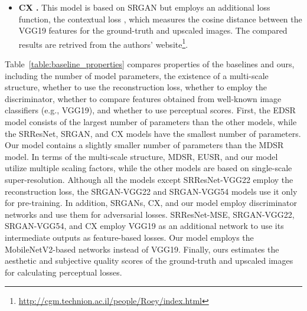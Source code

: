 \documentclass[runningheads]{llncs}
\begin{document}
\begin{itemize}
	\item \textbf{CX \cite{mechrez2018learning}.}
	This model is based on SRGAN but employs an additional loss function, the contextual loss \cite{mechrez2018contextual}, which measures the cosine distance between the VGG19 features for the ground-truth and upscaled images.
	The compared results are retrived from the authors' website\footnote{\url{http://cgm.technion.ac.il/people/Roey/index.html}}.
	
\end{itemize}

Table~\ref{table:baseline_properties} compares properties of the baselines and ours, including the number of model parameters, the existence of a multi-scale structure, whether to use the reconstruction loss, whether to employ the discriminator, whether to compare features obtained from well-known image classifiers (e.g., VGG19), and whether to use perceptual scores.
First, the EDSR model consists of the largest number of parameters than the other models, while the SRResNet, SRGAN, and CX models have the smallest number of parameters.
Our model contains a slightly smaller number of parameters than the MDSR model.
In terms of the multi-scale structure, MDSR, EUSR, and our model utilize multiple scaling factors, while the other models are based on single-scale super-resolution.
Although all the models except SRResNet-VGG22 employ the reconstruction loss, the SRGAN-VGG22 and SRGAN-VGG54 models use it only for pre-training.
In addition, SRGANs, CX, and our model employ discriminator networks and use them for adversarial losses.
SRResNet-MSE, SRGAN-VGG22, SRGAN-VGG54, and CX employ VGG19 as an additional network to use its intermediate outputs as feature-based losses.
Our model employs the MobileNetV2-based networks instead of VGG19.
Finally, ours estimates the aesthetic and subjective quality scores of the ground-truth and upscaled images for calculating perceptual losses.
\end{document}
